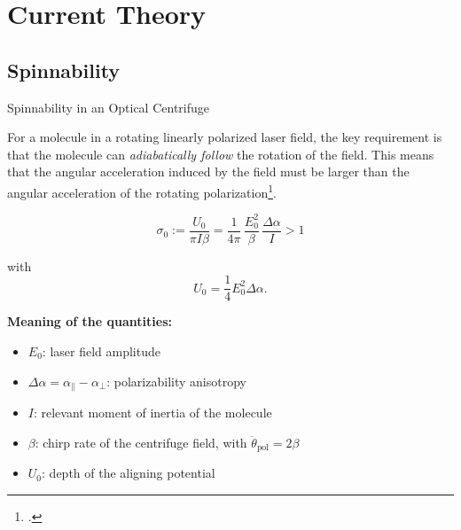 \section{Current Theory}
\subsection{Spinnability}
\begin{frame}{Spinnability in an Optical Centrifuge}

\small

For a molecule in a rotating linearly polarized laser field, the key requirement is
that the molecule can \emph{adiabatically follow} the rotation of the field. This means
that the angular acceleration induced by the field must be larger than the angular
acceleration of the rotating polarization\footcite{spinnability}.

\vspace{0.5em}

\begin{equation}
\sigma_0
:=
\frac{U_0}{\pi I \beta}
=
\frac{1}{4\pi}\,\frac{E_0^2}{\beta}\,\frac{\Delta\alpha}{I}
> 1
\end{equation}

\vspace{0.5em}

with
\begin{equation}
U_0=\frac{1}{4}E_0^2 \Delta\alpha .
\end{equation}

\vspace{0.5em}

\textbf{Meaning of the quantities:}
\begin{itemize}
    \item $E_0$: laser field amplitude
    \item $\Delta\alpha = \alpha_{\parallel}-\alpha_{\perp}$: polarizability anisotropy
    \item $I$: relevant moment of inertia of the molecule
    \item $\beta$: chirp rate of the centrifuge field, with $\ddot{\theta}_{\mathrm{pol}}=2\beta$
    \item $U_0$: depth of the aligning potential
\end{itemize}
\end{frame}

